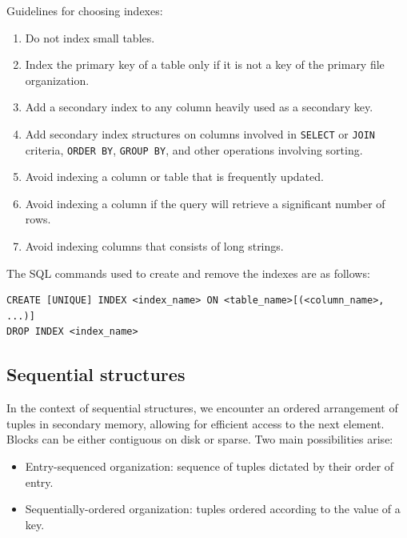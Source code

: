 Guidelines for choosing indexes:
\begin{enumerate}
  \item Do not index small tables. 
  \item Index the primary key of a table only if it is not a key of the primary file organization.
  \item Add a secondary index to any column heavily used as a secondary key.
  \item Add secondary index structures on columns involved in \texttt{SELECT} or \texttt{JOIN} criteria, \texttt{ORDER BY}, \texttt{GROUP BY}, and other operations involving sorting.
  \item Avoid indexing a column or table that is frequently updated.
  \item Avoid indexing a column if the query will retrieve a significant number of rows.
  \item Avoid indexing columns that consists of long strings.
\end{enumerate}

The SQL commands used to create and remove the indexes are as follows: 
\begin{lstlisting}[style=SQL]
CREATE [UNIQUE] INDEX <index_name> ON <table_name>[(<column_name>, ...)]
DROP INDEX <index_name>
\end{lstlisting}

\subsection{Sequential structures}
In the context of sequential structures, we encounter an ordered arrangement of tuples in secondary memory, allowing for efficient access to the next element. 
Blocks can be either contiguous on disk or sparse. 
Two main possibilities arise:
\begin{itemize}
    \item Entry-sequenced organization: sequence of tuples dictated by their order of entry. 
    \item Sequentially-ordered organization: tuples ordered according to the value of a key. 
\end{itemize}

